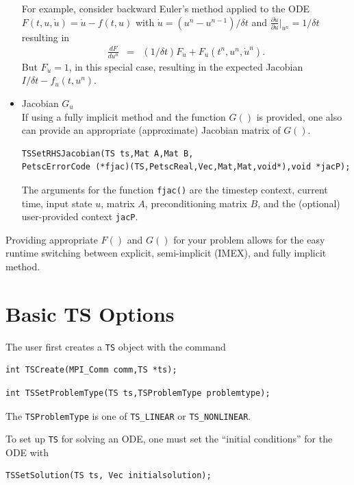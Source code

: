 \begin{itemize}
  For example, consider backward Euler's method applied to the ODE $ F(t, u, \dot{u}) = \dot{u} - f(t, u) $ with $ \dot{u} = (u^n - u^{n-1})/\delta t$ and
$ \frac{\partial \dot{u}}{\partial u}|_{u^n} = 1/\delta t $ resulting in
\begin{eqnarray*}
    \frac{d F}{d u^n} & = &   (1/\delta t)F_{\dot{u}} + F_u(t^n,u^n,\dot{u}^n).
\end{eqnarray*}
But $ F_{\dot{u}} = 1 $, in this special case, resulting in the expected Jacobian $ I/\delta t - f_u(t,u^n)$.

\item Jacobian $G_u$ \\
  If using a fully implicit method and the function $G()$ is provided, one also can provide an appropriate (approximate) Jacobian matrix of $G()$.
\begin{lstlisting}
TSSetRHSJacobian(TS ts,Mat A,Mat B,
PetscErrorCode (*fjac)(TS,PetscReal,Vec,Mat,Mat,void*),void *jacP);
\end{lstlisting}
  The arguments for the function \lstinline{fjac()}
  are the timestep context, current time, input state $u$, matrix $A$, preconditioning matrix
  $B$, and the (optional) user-provided context \lstinline{jacP}.
\end{itemize}

Providing appropriate $F()$ and $G()$ for your problem allows for the easy runtime switching between explicit, semi-implicit (IMEX), and fully implicit method.

\section{Basic TS Options}

The user first creates a \lstinline{TS} object with the command
\begin{lstlisting}
int TSCreate(MPI_Comm comm,TS *ts);
\end{lstlisting}

\begin{lstlisting}
int TSSetProblemType(TS ts,TSProblemType problemtype);
\end{lstlisting}
The \lstinline{TSProblemType}
is one of \lstinline{TS_LINEAR} or \lstinline{TS_NONLINEAR}.

\noindent To set up \lstinline{TS} for solving an ODE, one must set the ``initial conditions'' for the ODE with
\begin{lstlisting}
TSSetSolution(TS ts, Vec initialsolution);
\end{lstlisting}

